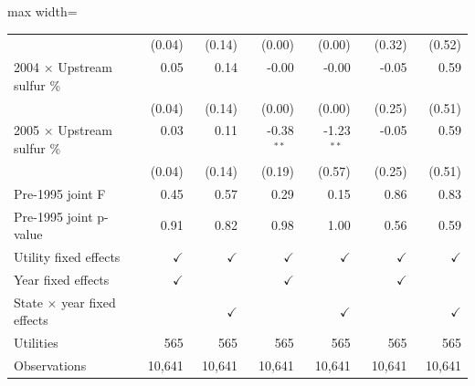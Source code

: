 \begin{table}[htbp]
{\begin{adjustbox}{max width=\linewidth}
\begin{tabular}{lrrrrrr}
 & (\phantom{-}0.04)\phantom{$^{***}$} & (\phantom{-}0.14)\phantom{$^{***}$} & (\phantom{-}0.00)\phantom{$^{***}$} & (\phantom{-}0.00)\phantom{$^{***}$} & (\phantom{-}0.32)\phantom{$^{***}$} & (\phantom{-}0.52)\phantom{$^{***}$} \\
2004 $\times$ Upstream sulfur \% & \phantom{(}\phantom{-}0.05$^{\phantom{*}\phantom{*}\phantom{*}}$ & \phantom{(}\phantom{-}0.14$^{\phantom{*}\phantom{*}\phantom{*}}$ & \phantom{(}-0.00$^{\phantom{*}\phantom{*}\phantom{*}}$ & \phantom{(}-0.00$^{\phantom{*}\phantom{*}\phantom{*}}$ & \phantom{(}-0.05$^{\phantom{*}\phantom{*}\phantom{*}}$ & \phantom{(}\phantom{-}0.59$^{\phantom{*}\phantom{*}\phantom{*}}$ \\
 & (\phantom{-}0.04)\phantom{$^{***}$} & (\phantom{-}0.14)\phantom{$^{***}$} & (\phantom{-}0.00)\phantom{$^{***}$} & (\phantom{-}0.00)\phantom{$^{***}$} & (\phantom{-}0.25)\phantom{$^{***}$} & (\phantom{-}0.51)\phantom{$^{***}$} \\
2005 $\times$ Upstream sulfur \% & \phantom{(}\phantom{-}0.03$^{\phantom{*}\phantom{*}\phantom{*}}$ & \phantom{(}\phantom{-}0.11$^{\phantom{*}\phantom{*}\phantom{*}}$ & \phantom{(}-0.38$^{**\phantom{*}}$ & \phantom{(}-1.23$^{**\phantom{*}}$ & \phantom{(}-0.05$^{\phantom{*}\phantom{*}\phantom{*}}$ & \phantom{(}\phantom{-}0.59$^{\phantom{*}\phantom{*}\phantom{*}}$ \\
 & (\phantom{-}0.04)\phantom{$^{***}$} & (\phantom{-}0.14)\phantom{$^{***}$} & (\phantom{-}0.19)\phantom{$^{***}$} & (\phantom{-}0.57)\phantom{$^{***}$} & (\phantom{-}0.25)\phantom{$^{***}$} & (\phantom{-}0.51)\phantom{$^{***}$} \\
\hline
Pre-1995 joint F & 0.45 & 0.57 & 0.29 & 0.15 & 0.86 & 0.83 \\
Pre-1995 joint p-value & 0.91 & 0.82 & 0.98 & 1.00 & 0.56 & 0.59 \\
Utility fixed effects & $\checkmark$ & $\checkmark$ & $\checkmark$ & $\checkmark$ & $\checkmark$ & $\checkmark$ \\
Year fixed effects & $\checkmark$ &  & $\checkmark$ &  & $\checkmark$ &  \\
State $\times$ year fixed effects &  & $\checkmark$ &  & $\checkmark$ &  & $\checkmark$ \\
Utilities & 565 & 565 & 565 & 565 & 565 & 565 \\
Observations & 10,641 & 10,641 & 10,641 & 10,641 & 10,641 & 10,641 \\
\bottomrule
\end{tabular}
\end{adjustbox}
}
\end{table}
